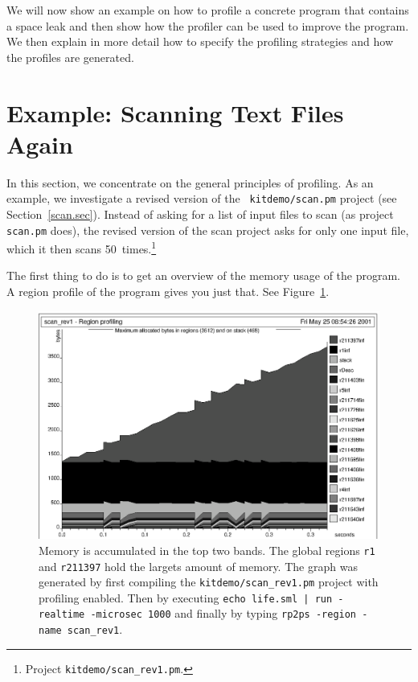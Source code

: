 \documentclass[12pt]{book}
\begin{document}
We will now show an example on how to profile a concrete program that
contains a space leak and then show how the profiler can be used to
improve the program. We then explain in more detail how to specify the
profiling strategies and how the profiles are generated.

\section{Example: Scanning Text Files Again}

In this section, we concentrate on the general principles of
profiling. As an example, we investigate a revised version of the {\tt
  kitdemo/scan.pm} project (see Section~\ref{scan.sec}). Instead of
asking for a list of input files to scan (as project \texttt{scan.pm}
does), the revised version of the scan project asks for only one input
file, which it then scans
%
50~times.\footnote{Project {\tt kitdemo/scan\_rev1.pm}.}

The first thing to do is to get an overview of the memory usage of the
program. A region profile of the program gives you just that. See
Figure~\ref{scan_rev1_1.fig}.
\begin{figure}
\begin{center}
  \includegraphics{scan_rev1_1.ps}
\end{center}
\caption{Memory is accumulated in the top two
  bands. The global regions \texttt{r1} and \texttt{r211397} hold the
  largets amount of memory. The graph was generated by first
  compiling the {\tt kitdemo/scan\_rev1.pm} project with profiling
  enabled. Then by executing \texttt{echo life.sml | run -realtime -microsec 1000} and finally by
  typing \texttt{rp2ps -region -name scan\_rev1}.}
\label{scan_rev1_1.fig}
\end{figure}
\end{document}
